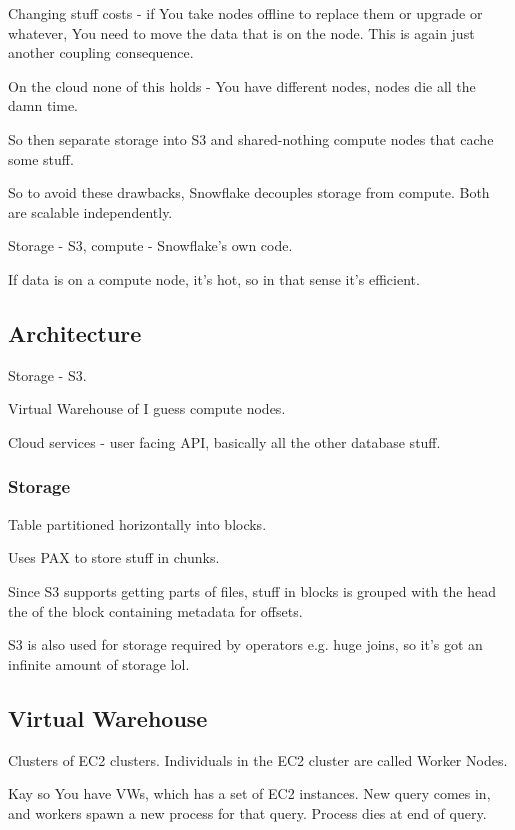 \documentclass{article}
\begin{document}
		Changing stuff costs - if You take nodes offline to replace them or upgrade or whatever, You need to move the data that is on the node. This is again just another coupling consequence.
		
		On the cloud none of this holds - You have different nodes, nodes die all the damn time.
		
		So then separate storage into S3 and shared-nothing compute nodes that cache some stuff.
		
		So to avoid these drawbacks, Snowflake decouples storage from compute. Both are scalable independently.
		
		Storage - S3, compute - Snowflake's own code.
		
		If data is on a compute node, it's hot, so in that sense it's efficient.
		
	\subsection{Architecture}
	
		Storage - S3.
		
		Virtual Warehouse of I guess compute nodes.
		
		Cloud services - user facing API, basically all the other database stuff.
		
		\subsubsection{Storage}
		
			Table partitioned horizontally into blocks.
			
			Uses PAX to store stuff in chunks.
			
			Since S3 supports getting parts of files, stuff in blocks is grouped with the head the of the block containing metadata for offsets.
			
			S3 is also used for storage required by operators e.g. huge joins, so it's got an infinite amount of storage lol.
			
	\subsection{Virtual Warehouse}
	
		Clusters of EC2 clusters. Individuals in the EC2 cluster are called Worker Nodes.
		
		Kay so You have VWs, which has a set of EC2 instances. New query comes in, and workers spawn a new process for that query. Process dies at end of query.
		
\end{document}
